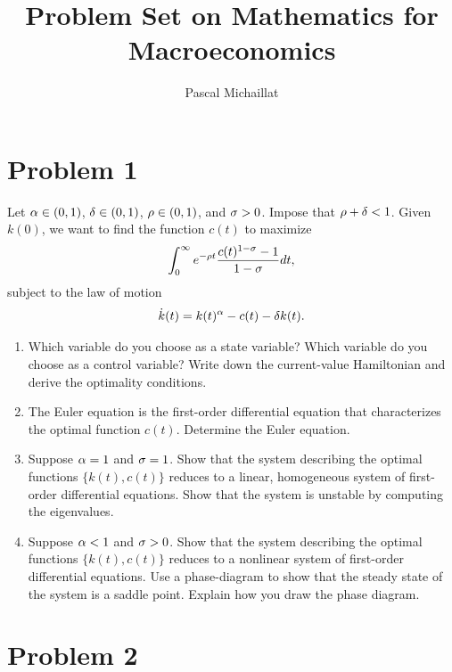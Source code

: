 \documentclass[letterpaper, 11pt, leqno]{article}
\begin{document}
\title{Problem Set on Mathematics for Macroeconomics}
\author{Pascal Michaillat}
\date{}
\begin{titlepage}
\maketitle
\end{titlepage}

\section*{Problem 1}

Let $\alpha \in (0,1)$, $\delta \in (0,1)$, $\rho \in (0,1)$, and $\sigma>0$. Impose that $\rho+\delta<1$. Given $k(0)$, we want to find the function $c(t) $ to maximize 
\begin{equation*}
\int_{0}^{\infty}e^{-\rho t} \frac{c(t)^{1-\sigma}-1}{1-\sigma} dt,
\end{equation*}
subject to the law of motion
\begin{equation*}
\dot{k}(t) =k(t)^{\alpha}-c(t)-\delta k(t).
\end{equation*}

\begin{enumerate}
\item Which variable do you choose as a state variable? Which variable do you choose as a control variable? Write down the current-value Hamiltonian and derive the optimality conditions.
\item The Euler equation is the first-order differential equation that characterizes the optimal function $c(t)$. Determine the Euler equation.
\item Suppose $\alpha =1$ and $\sigma =1$. Show that the system describing the optimal functions $\{k(t),c(t)\}$ reduces to a linear, homogeneous system of first-order differential equations. Show that the system is unstable by computing the eigenvalues. 
\item Suppose $\alpha <1$ and $\sigma >0$. Show that the system describing the optimal functions $\{k(t),c(t)\}$ reduces to a nonlinear system of first-order differential equations. Use a phase-diagram to show that the steady state of the system is a saddle point. Explain how you draw the phase diagram.
\end{enumerate}

\section*{Problem 2}
\end{document}
